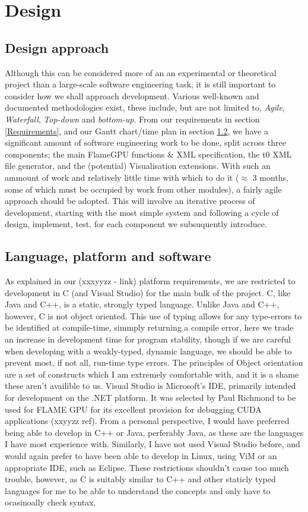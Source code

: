 \documentclass[11pt,a4paper]{article}
\begin{document}
\newpage
\section{Design}

\subsection{Design approach}
Although this can be considered more of an an experimental or theoretical project than a large-scale software engineering task, it is still important to consider how we shall approach development. Various well-known and documented methodologies exist, these include, but are not limited to, \emph{Agile}, \emph{Waterfall}, \emph{Top-down} and \emph{bottom-up}. From our requirements in section \ref{Requirements}, and our Gantt chart/time plan in section \ref{}, we have a significant amount of software engineering work to be done, split across three components; the main FlameGPU functions \& XML specification, the t0 XML file generator, and the (potential) Visualisation extensions. With such an ammount of work and relatively little time with which to do it ($\approx$ 3 months, some of which must be occupied by work from other modules), a fairly agile approach should be adopted. This will involve an iterative process of development, starting with the most simple system and following a cycle of design, implement, test, for each component we subsuquently introduce.

\subsection{Language, platform and software}
As explained in our (xxxyyzz - link) platform requirements, we are restricted to development in C (and Visual Studio) for the main bulk of the project. C, like Java and C++, is a static, strongly typed language. Unlike Java and C++, however, C is not object oriented. This use of typing allows for any type-errors to be identified at compile-time, simmply returning a compile error, here we trade an increase in development time for program stability, though if we are careful when developing with a weakly-typed, dynamic language, we should be able to prevent most, if not all, run-time type errors. The principles of Object orientation are a set of constructs which I am extremely comfortable with, and it is a shame these aren't availible to us. Visual Studio is Microsoft's IDE, primarily intended for development on the .NET platform. It was selected by Paul Richmond to be used for FLAME GPU for its excellent provision for debugging CUDA applications (xxyyzz ref). From a personal perspective, I would have preferred being able to develop in C++ or Java, perferably Java, as these are the languages I have most experience with. Similarly, I have not used Visual Studio before, and would again prefer to have been able to develop in Linux, using ViM or an appropriate IDE, such as Eclipse. These restrictions shouldn't cause too much trouble, however, as C is suitably similar to C++ and other staticly typed languages for me to be able to understand the concepts and only have to ocasinoally check syntax.
\end{document}
